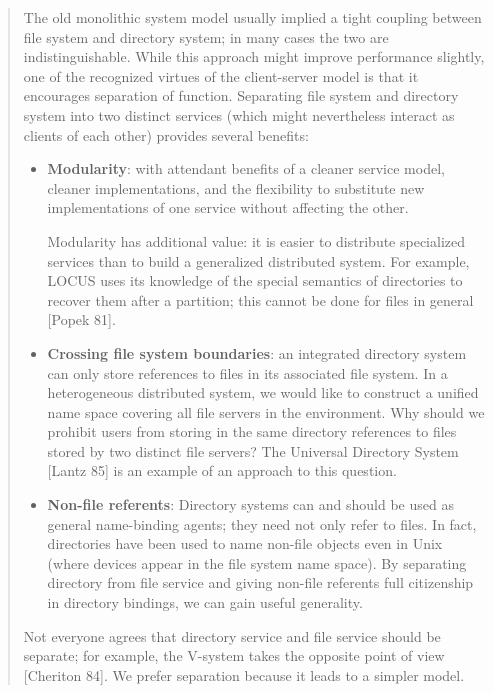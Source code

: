 \begin{quotation}

    The old monolithic system model usually implied a tight coupling between file system and directory
    system; in many cases the two are indistinguishable. While this approach might improve performance
    slightly, one of the recognized virtues of the client-server model is that it encourages separation of function.
    Separating file system and directory system into two distinct services (which might nevertheless interact as
    clients of each other) provides several benefits:
    \begin{itemize}
        \item \textbf{Modularity}: with attendant benefits of a cleaner service model, cleaner implementations, and
              the flexibility to substitute new implementations of one service without affecting the other.

              Modularity has additional value: it is easier to distribute specialized services than to build a
              generalized distributed system. For example, LOCUS uses its knowledge of the special
              semantics of directories to recover them after a partition; this cannot be done for files in
              general [Popek 81].

        \item \textbf{Crossing file system boundaries}: an integrated directory system can only store references to
              files in its associated file system. In a heterogeneous distributed system, we would like to
              construct a unified name space covering all file servers in the environment. Why should we
              prohibit users from storing in the same directory references to files stored by two distinct file
              servers? The Universal Directory System [Lantz 85] is an example of an approach to this
              question.

        \item \textbf{Non-file referents}: Directory systems can and should be used as general name-binding agents;
              they need not only refer to files. In fact, directories have been used to name non-file objects
              even in Unix (where devices appear in the file system name space). By separating directory
              from file service and giving non-file referents full citizenship in directory bindings, we can
              gain useful generality.
    \end{itemize}

    Not everyone agrees that directory service and file service should be separate; for example, the V-system
    takes the opposite point of view [Cheriton 84]. We prefer separation because it
    leads to a simpler model.

\end{quotation}

